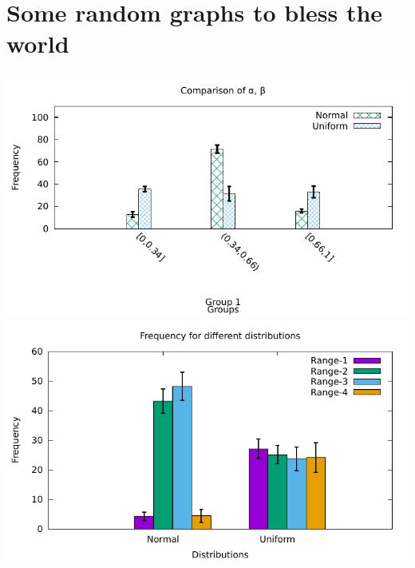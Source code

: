 \section{Some random graphs to bless the world}
\includegraphics[scale=0.7]{graph1.pdf}
\includegraphics[scale=0.7]{graph2.pdf}

